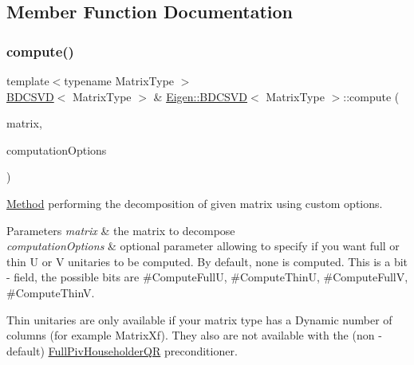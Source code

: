 \subsection{Member Function Documentation}
\mbox{\label{class_eigen_1_1_b_d_c_s_v_d_a52e3c627775010775c64d16a00cdb770}} 
\subsubsection{\texorpdfstring{compute()}{compute()}\hspace{0.1cm}{\footnotesize\ttfamily [1/2]}}
{\footnotesize\ttfamily template$<$typename Matrix\+Type $>$ \\
\mbox{\hyperlink{class_eigen_1_1_b_d_c_s_v_d}{B\+D\+C\+S\+VD}}$<$ Matrix\+Type $>$ \& \mbox{\hyperlink{class_eigen_1_1_b_d_c_s_v_d}{Eigen\+::\+B\+D\+C\+S\+VD}}$<$ Matrix\+Type $>$\+::compute (\begin{DoxyParamCaption}\item[{const Matrix\+Type \&}]{matrix,  }\item[{unsigned int}]{computation\+Options }\end{DoxyParamCaption})}



\mbox{\hyperlink{struct_method}{Method}} performing the decomposition of given matrix using custom options. 


\begin{DoxyParams}{Parameters}
{\em matrix} & the matrix to decompose \\
\hline
{\em computation\+Options} & optional parameter allowing to specify if you want full or thin U or V unitaries to be computed. By default, none is computed. This is a bit -\/ field, the possible bits are \#\+Compute\+FullU, \#\+Compute\+ThinU, \#\+Compute\+FullV, \#\+Compute\+ThinV.\\
\hline
\end{DoxyParams}
Thin unitaries are only available if your matrix type has a Dynamic number of columns (for example Matrix\+Xf). They also are not available with the (non -\/ default) \mbox{\hyperlink{class_eigen_1_1_full_piv_householder_q_r}{Full\+Piv\+Householder\+QR}} preconditioner. \mbox{\label{class_eigen_1_1_b_d_c_s_v_d_acf27f41ed044d74ea8e8cbaf17ffdb04}} 
